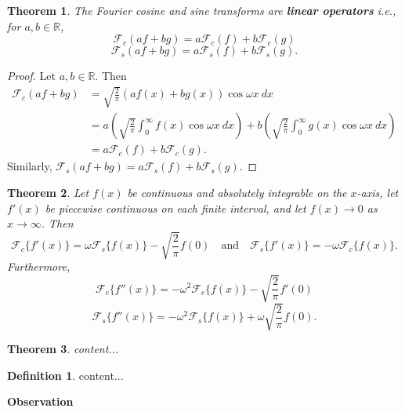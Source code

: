 \documentclass[12pt,openany]{book}
\newtheorem{theorem}{Theorem}[chapter]
\theoremstyle{definition}
\newtheorem{definition}{Definition}[chapter]
\newcommand{\R}{\mathbb{R}}
\newcommand{\of}[1]{\left( #1 \right)}
\begin{document}
	\newpage
	\begin{tcolorbox}[colframe=thmcolor, title={\color{white}\bf Linearity of Fourier Cosine and Sine Transforms}]
		\begin{theorem}
			The Fourier cosine and sine transforms are \textbf{linear operators} i.e., for \(a, b \in \mathbb{R}\),
			\[
			\mathcal{F}_c(af + bg) = a\mathcal{F}_c(f) + b\mathcal{F}_c(g)
			\]
			\[
			\mathcal{F}_s(af + bg) = a\mathcal{F}_s(f) + b\mathcal{F}_s(g).
			\]
		\end{theorem}
	\end{tcolorbox}
	\begin{proof}
		Let $a,b\in\R$. Then \begin{align*}
			\mathcal{F}_c(af+bg)&=\sqrt{\frac{2}{\pi}}\of{af(x)+bg(x)}\cos\omega x\ dx\\
			&=a\of{\sqrt{\frac{2}{\pi}}\int_0^\infty f(x)\cos\omega x\ dx}+b\of{\sqrt{\frac{2}{\pi}}\int_0^\infty g(x)\cos\omega x\ dx}\\
			&=a\mathcal{F}_c(f)+b\mathcal{F}_c(g).
		\end{align*} Similarly, $\mathcal{F}_s(af + bg) = a\mathcal{F}_s(f) + b\mathcal{F}_s(g)$.
	\end{proof}
	\vspace{12pt}
	\begin{tcolorbox}[colframe=thmcolor, title={\color{white}\bf Cosine and Sine Transforms of Derivatives}]
		\begin{theorem}
			Let \( f(x) \) be continuous and absolutely integrable on the \( x \)-axis, let \( f'(x) \) be piecewise continuous on each finite interval, and let \( f(x) \to 0 \) as \( x \to \infty \). Then
			\[
			\mathcal{F}_c \{ f'(x) \} = \omega\mathcal{F}_s \{ f(x) \} - \sqrt{\frac{2}{\pi}} f(0) \quad \text{and} \quad \mathcal{F}_s \{ f'(x) \} = -\omega\mathcal{F}_c \{ f(x) \}.
			\]
			Furthermore,
			\[
			\mathcal{F}_c \{ f''(x) \} = -\omega^2 \mathcal{F}_c \{ f(x) \} - \sqrt{\frac{2}{\pi}} f'(0)
			\]
			\[
			\mathcal{F}_s \{ f''(x) \} = -\omega^2 \mathcal{F}_s \{ f(x) \} + \omega \sqrt{\frac{2}{\pi}} f(0).
			\]
		\end{theorem}
	\end{tcolorbox}
	
	\newpage
	\begin{tcolorbox}[colframe=thmcolor, title={\color{white}\bf Fourier Cosine and Since Series}]
		\begin{theorem}
			content...
		\end{theorem}
	\end{tcolorbox}
	\begin{tcolorbox}[colframe=defcolor, title={\color{white}\bf Fourier Cosine and Since Series}]
		\begin{definition}
			content...
		\end{definition}
	\end{tcolorbox}
	\textbf{Observation}
	
\end{document}

